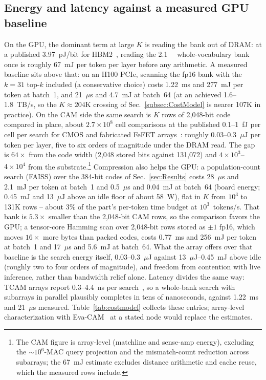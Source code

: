 \documentclass[conference]{IEEEtran}
\newcommand{\cam}{{CAM}\xspace}
\newcommand{\tcam}{{TCAM}\xspace}
\newcommand{\fefet}{{FeFET}\xspace}
\begin{document}
\subsection{Energy and latency against a measured GPU baseline}
\label{subsec:CostModelGap}
\label{subsec:NextMeasurements}
On the GPU, the dominant term at large $K$ is reading the bank out of
DRAM: at a published 3.97~pJ/bit for HBM2~\cite{oconnor2017fgdram},
reading the \qty{2.1}{\giga\byte} whole-vocabulary bank once is
roughly 67~mJ per token per layer before any arithmetic. A measured
baseline sits above that: on an H100 PCIe, scanning the fp16 bank
with the $k=31$ top-$k$ included (a conservative choice) costs
1.22~ms and 277~mJ per token at batch~1, and 21~$\mu$s and 4.7~mJ at
batch~64 (at an achieved
1.6--1.8~TB/s, so the $K\!\approx\!204$K crossing of
Sec.~\ref{subsec:CostModel} is nearer 107K in practice). On the \cam
side the same search is $K$ rows of 2{,}048-bit code compared in
place, about $2.7\!\times\!10^{8}$ cell comparisons at the published
0.1--1~fJ per cell per search for CMOS and fabricated \fefet
arrays~\cite{pagiamtzis2006cam,ni2019fetcam,liu2022evacam}: roughly
0.03--0.3~$\mu$J per token per layer, five to six orders of magnitude
under the DRAM read. The gap is $64\times$ from the code width
(2{,}048 stored bits against 131{,}072) and
$4\!\times\!10^{3}$--$4\!\times\!10^{4}$ from the
substrate.\footnote{The \cam figure is array-level (matchline and
sense-amp energy), excluding the $\sim$$10^{6}$-MAC query projection
and the mismatch-count reduction across subarrays; the 67~mJ
estimate excludes distance arithmetic and cache reuse, which the
measured rows include.} Compression also helps the GPU: a
population-count search (FAISS) over the 384-bit codes of
Sec.~\ref{sec:Results} costs 28~$\mu$s and 2.1~mJ per token at
batch~1 and 0.5~$\mu$s and 0.04~mJ at batch~64 (board energy;
0.45~mJ and 13~$\mu$J above an idle floor of about 58~W), flat in $K$
from $10^{3}$ to 131K rows -- about 3\% of the part's per-token time
budget at $10^{3}$~tokens/s. That bank is $5.3\times$ smaller than
the 2{,}048-bit \cam rows, so the comparison favors the GPU; a
tensor-core Hamming scan over 2{,}048-bit rows stored as $\pm1$ fp16,
which moves $16\times$ more bytes than packed codes, costs 0.77~ms and
256~mJ per token at batch~1 and 17~$\mu$s and 5.6~mJ at batch~64.
What the array offers over that baseline
is the search energy itself, 0.03--0.3~$\mu$J against
13~$\mu$J--0.45~mJ above idle (roughly two to four orders of
magnitude), and freedom from contention with live inference, rather
than bandwidth relief alone. Latency divides the same way:
\tcam arrays report 0.3--4.4~ns per
search~\cite{liu2022evacam,ni2019fetcam}, so a whole-bank search with
subarrays in parallel plausibly completes in tens of nanoseconds,
against 1.22~ms and 21~$\mu$s measured. Table~\ref{tab:costmodel}
collects these entries; array-level characterization with
Eva-CAM~\cite{liu2022evacam} at a stated node would replace the
estimates.
\end{document}
